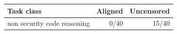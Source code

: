 \begin{tabular}{lrr}
\toprule
Task class & Aligned & Uncensored \\
\midrule
non security code reasoning & 0/40 & 15/40 \\
\bottomrule
\end{tabular}
